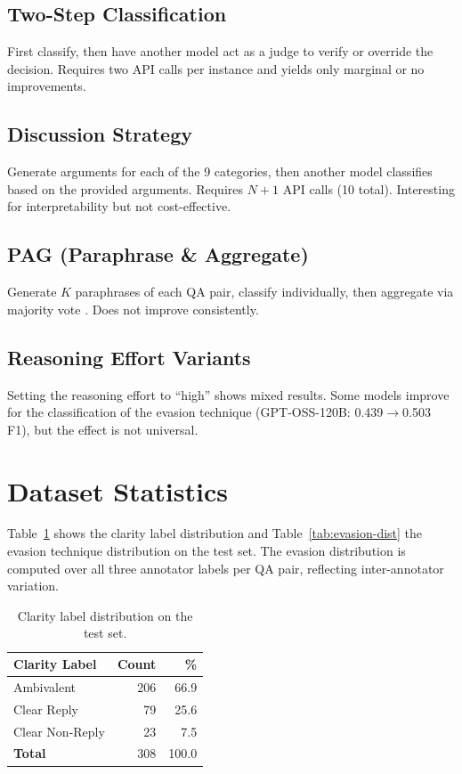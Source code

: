 \documentclass[11pt]{article}
\begin{document}
\subsection{Two-Step Classification}
First classify, then have another model act as a judge to verify or override the decision.
Requires two API calls per instance and yields only marginal or no improvements.

\subsection{Discussion Strategy}
Generate arguments for each of the 9 categories, then another model classifies based on the provided arguments.
Requires $N{+}1$ API calls (10 total).
Interesting for interpretability but not cost-effective.

\subsection{PAG (Paraphrase \& Aggregate)}
Generate $K$ paraphrases of each QA pair, classify individually, then aggregate via majority vote \citep{yadav2024pag}.
Does not improve consistently.

\subsection{Reasoning Effort Variants}
Setting the reasoning effort to ``high'' shows mixed results.
Some models improve for the classification of the evasion technique (GPT-OSS-120B: 0.439$\rightarrow$0.503 F1), but the effect is not universal.

\section{Dataset Statistics}
\label{sec:appendix-dataset}

Table~\ref{tab:clarity-dist} shows the clarity label distribution and Table~\ref{tab:evasion-dist} the evasion technique distribution on the test set.
The evasion distribution is computed over all three annotator labels per QA pair, reflecting inter-annotator variation.

\begin{table}[H]
\centering
\small
\begin{tabular}{@{}lrr@{}}
\toprule
\textbf{Clarity Label} & \textbf{Count} & \textbf{\%} \\
\midrule
Ambivalent & 206 & 66.9 \\
Clear Reply & 79 & 25.6 \\
Clear Non-Reply & 23 & 7.5 \\
\midrule
\textbf{Total} & 308 & 100.0 \\
\bottomrule
\end{tabular}
\caption{Clarity label distribution on the test set.}
\label{tab:clarity-dist}
\end{table}
\end{document}
